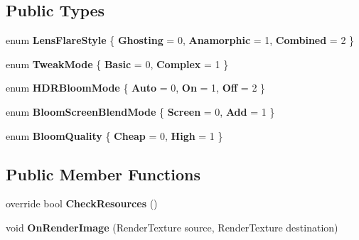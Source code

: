 \subsection*{Public Types}
\begin{DoxyCompactItemize}
\item 
enum {\bfseries Lens\+Flare\+Style} \{ {\bfseries Ghosting} = 0, 
{\bfseries Anamorphic} = 1, 
{\bfseries Combined} = 2
 \}\hypertarget{class_unity_standard_assets_1_1_image_effects_1_1_bloom_aef3c132e0ec321165c67adf5364605dd}{}\label{class_unity_standard_assets_1_1_image_effects_1_1_bloom_aef3c132e0ec321165c67adf5364605dd}

\item 
enum {\bfseries Tweak\+Mode} \{ {\bfseries Basic} = 0, 
{\bfseries Complex} = 1
 \}\hypertarget{class_unity_standard_assets_1_1_image_effects_1_1_bloom_a347c36b6b2157676e03ad0d9b18a27fd}{}\label{class_unity_standard_assets_1_1_image_effects_1_1_bloom_a347c36b6b2157676e03ad0d9b18a27fd}

\item 
enum {\bfseries H\+D\+R\+Bloom\+Mode} \{ {\bfseries Auto} = 0, 
{\bfseries On} = 1, 
{\bfseries Off} = 2
 \}\hypertarget{class_unity_standard_assets_1_1_image_effects_1_1_bloom_a1178b6e7394c2a01d13ae4e8f46abb32}{}\label{class_unity_standard_assets_1_1_image_effects_1_1_bloom_a1178b6e7394c2a01d13ae4e8f46abb32}

\item 
enum {\bfseries Bloom\+Screen\+Blend\+Mode} \{ {\bfseries Screen} = 0, 
{\bfseries Add} = 1
 \}\hypertarget{class_unity_standard_assets_1_1_image_effects_1_1_bloom_aa4397c9399f598ffb4b75a1a49501718}{}\label{class_unity_standard_assets_1_1_image_effects_1_1_bloom_aa4397c9399f598ffb4b75a1a49501718}

\item 
enum {\bfseries Bloom\+Quality} \{ {\bfseries Cheap} = 0, 
{\bfseries High} = 1
 \}\hypertarget{class_unity_standard_assets_1_1_image_effects_1_1_bloom_a38ac8039f8a9f5246ce838730d19efcc}{}\label{class_unity_standard_assets_1_1_image_effects_1_1_bloom_a38ac8039f8a9f5246ce838730d19efcc}

\end{DoxyCompactItemize}
\subsection*{Public Member Functions}
\begin{DoxyCompactItemize}
\item 
override bool {\bfseries Check\+Resources} ()\hypertarget{class_unity_standard_assets_1_1_image_effects_1_1_bloom_ac5626c3769fbfaa55d651d22801e0017}{}\label{class_unity_standard_assets_1_1_image_effects_1_1_bloom_ac5626c3769fbfaa55d651d22801e0017}

\item 
void {\bfseries On\+Render\+Image} (Render\+Texture source, Render\+Texture destination)\hypertarget{class_unity_standard_assets_1_1_image_effects_1_1_bloom_a92b38d926c4127bc5486214eaf4b0af4}{}\label{class_unity_standard_assets_1_1_image_effects_1_1_bloom_a92b38d926c4127bc5486214eaf4b0af4}

\end{DoxyCompactItemize}
